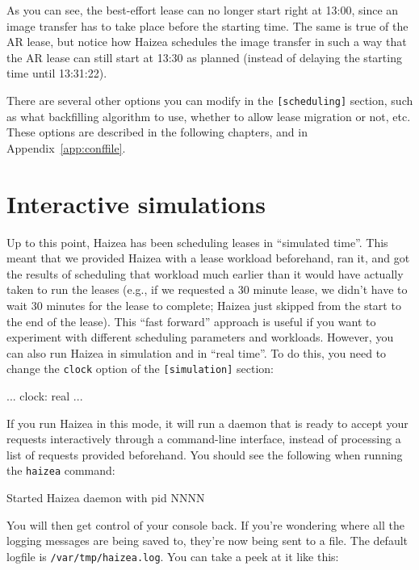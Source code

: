 As you can see, the best-effort lease can no longer start right at 13:00, since an image transfer has to take place before the starting time. The same is true of the AR lease, but notice how Haizea schedules the image transfer in such a way that the AR lease can still start at 13:30 as planned (instead of delaying the starting time until 13:31:22).

There are several other options you can modify in the \texttt{[scheduling]} section, such as what backfilling algorithm to use, whether to allow lease migration or not, etc. These options are described in the following chapters, and in Appendix~\ref{app:conffile}.

\section{Interactive simulations} 

Up to this point, Haizea has been scheduling leases in ``simulated time''. This meant that we provided Haizea with a lease workload beforehand, ran it, and got the results of scheduling that workload much earlier than it would have actually taken to run the leases (e.g., if we requested a 30 minute lease, we didn't have to wait 30 minutes for the lease to complete; Haizea just skipped from the start to the end of the lease). This ``fast forward'' approach is useful if you want to experiment with different scheduling parameters and workloads. However, you can also run Haizea in simulation and in ``real time''. To do this, you need to change the \texttt{clock} option of the \texttt{[simulation]} section:

\begin{wideshellverbatim}
[simulation]
...
clock: real
...
\end{wideshellverbatim}

If you run Haizea in this mode, it will run a daemon that is ready to accept your requests interactively through a command-line interface, instead of processing a list of requests provided beforehand. You should see the following when running the \texttt{haizea} command:

\begin{wideshellverbatim}
Started Haizea daemon with pid NNNN
\end{wideshellverbatim}

You will then get control of your console back. If you're wondering where all the logging messages are being saved to, they're now being sent to a file. The default logfile is \texttt{/var/tmp/haizea.log}. You can take a peek at it like this:

